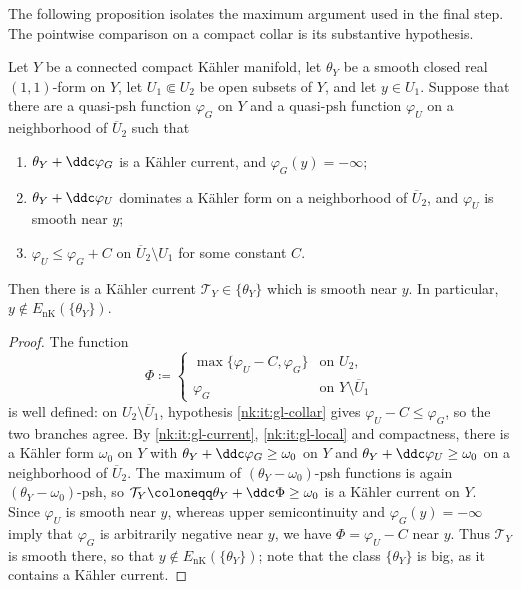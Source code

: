 The following proposition isolates the maximum argument used in the final step. The pointwise comparison on a compact collar is its substantive hypothesis.

\begin{proposition}\label{nk:prop:gluing}
Let $Y$ be a connected compact K\"ahler manifold, let $\theta_Y$ be
a smooth closed real $(1,1)$-form on $Y$, let $U_1\Subset U_2$ be
open subsets of $Y$, and let $y\in U_1$. Suppose that there are a
quasi-psh function $\varphi_G$ on $Y$ and a quasi-psh function
$\varphi_U$ on a neighborhood of $\overline U_2$ such that
\begin{enumerate}[label=\textup{(\roman*)},leftmargin=*,itemsep=.25em]
\item\label{nk:it:gl-current}
  $\theta_Y+\ddc\varphi_G$ is a K\"ahler current, and
  $\varphi_G(y)=-\infty$;
\item\label{nk:it:gl-local}
  $\theta_Y+\ddc\varphi_U$ dominates a K\"ahler form on a neighborhood
  of $\overline U_2$, and $\varphi_U$ is smooth near $y$;
\item\label{nk:it:gl-collar}
  $\varphi_U\le\varphi_G+C$ on $\overline U_2\setminus U_1$ for some
  constant $C$.
\end{enumerate}
Then there is a K\"ahler current $\mathcal T_Y\in\{\theta_Y\}$ which is
smooth near $y$. In particular, $y\notin{E_{\mathrm{nK}}}(\{\theta_Y\})$.
\end{proposition}

\begin{proof}
The function
\[
  \Phi\coloneqq 
  \begin{cases}
    \max\{\varphi_U-C,\varphi_G\}&\text{on }U_2,\\
    \varphi_G&\text{on }Y\setminus\overline U_1
  \end{cases}
\]
is well defined: on $U_2\setminus\overline U_1$, hypothesis
\ref{nk:it:gl-collar} gives $\varphi_U-C\le\varphi_G$, so the two
branches agree. By \ref{nk:it:gl-current}, \ref{nk:it:gl-local} and
compactness, there is a K\"ahler form $\omega_0$ on $Y$ with
$\theta_Y+\ddc\varphi_G\ge\omega_0$ on $Y$ and
$\theta_Y+\ddc\varphi_U\ge\omega_0$ on a neighborhood of
$\overline U_2$. The maximum of $(\theta_Y-\omega_0)$-psh functions
is again $(\theta_Y-\omega_0)$-psh, so
$\mathcal T_Y\coloneqq \theta_Y+\ddc\Phi\ge\omega_0$ is a K\"ahler current on
$Y$. Since $\varphi_U$ is smooth near $y$, whereas upper
semicontinuity and $\varphi_G(y)=-\infty$ imply that $\varphi_G$ is
arbitrarily negative near $y$, we have $\Phi=\varphi_U-C$ near
$y$. Thus $\mathcal T_Y$ is smooth there, so that
$y\notin{E_{\mathrm{nK}}}(\{\theta_Y\})$; note that the class $\{\theta_Y\}$ is
big, as it contains a K\"ahler current.
\end{proof}

